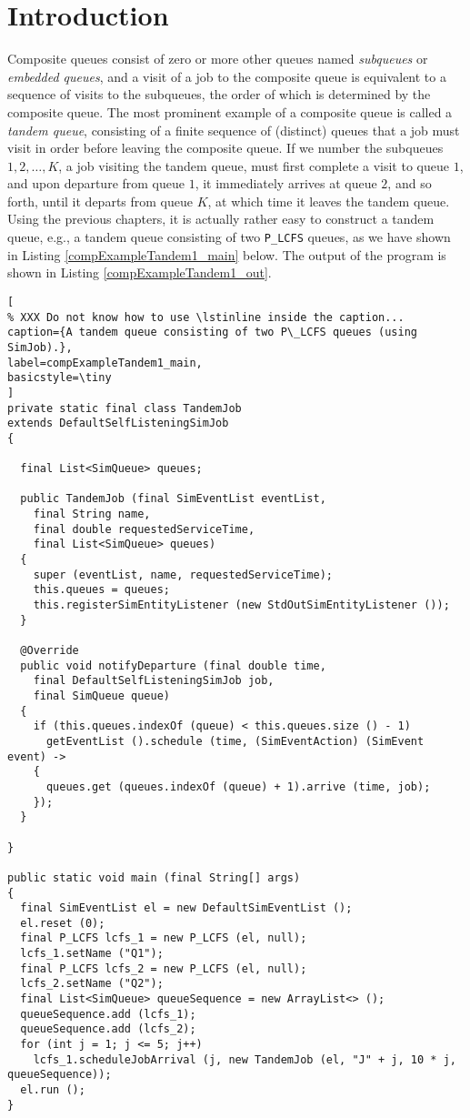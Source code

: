 \section{Introduction}

Composite queues consist of zero or more other queues
  named {\em subqueues\/} or {\em embedded queues},
  and a visit of a job to the composite queue is
  equivalent to a sequence of visits to the subqueues,
  the order of which is determined by the composite queue.
The most prominent example of a composite queue is called a {\em tandem queue\/},
  consisting of a finite sequence of (distinct) queues that a job must visit
  in order before leaving the composite queue.
If we number the subqueues $1, 2, \ldots, K$,
  a job visiting the tandem queue, must first complete
  a visit to queue $1$, and upon departure from queue $1$,
  it immediately arrives at queue $2$, and so forth,
  until it departs from queue $K$,
  at which time it leaves the tandem queue.
Using the previous chapters,
  it is actually rather easy to construct a tandem queue,
  e.g., a tandem queue consisting of two \lstinline|P_LCFS| queues,
  as we have shown in Listing \ref{compExampleTandem1_main} below.
The output of the program is shown in Listing \ref{compExampleTandem1_out}.

\begin{lstlisting}[
% XXX Do not know how to use \lstinline inside the caption...
caption={A tandem queue consisting of two P\_LCFS queues (using SimJob).},
label=compExampleTandem1_main,
basicstyle=\tiny
]
private static final class TandemJob
extends DefaultSelfListeningSimJob
{

  final List<SimQueue> queues;
    
  public TandemJob (final SimEventList eventList,
    final String name,
    final double requestedServiceTime,
    final List<SimQueue> queues)
  {
    super (eventList, name, requestedServiceTime);
    this.queues = queues;
    this.registerSimEntityListener (new StdOutSimEntityListener ());
  }

  @Override
  public void notifyDeparture (final double time,
    final DefaultSelfListeningSimJob job,
    final SimQueue queue)
  {
    if (this.queues.indexOf (queue) < this.queues.size () - 1)
      getEventList ().schedule (time, (SimEventAction) (SimEvent event) ->
    {
      queues.get (queues.indexOf (queue) + 1).arrive (time, job);
    });
  }

}
  
public static void main (final String[] args)
{    
  final SimEventList el = new DefaultSimEventList ();
  el.reset (0);
  final P_LCFS lcfs_1 = new P_LCFS (el, null);
  lcfs_1.setName ("Q1");
  final P_LCFS lcfs_2 = new P_LCFS (el, null);
  lcfs_2.setName ("Q2");
  final List<SimQueue> queueSequence = new ArrayList<> ();
  queueSequence.add (lcfs_1);
  queueSequence.add (lcfs_2);
  for (int j = 1; j <= 5; j++)
    lcfs_1.scheduleJobArrival (j, new TandemJob (el, "J" + j, 10 * j, queueSequence));
  el.run ();
}
\end{lstlisting}

